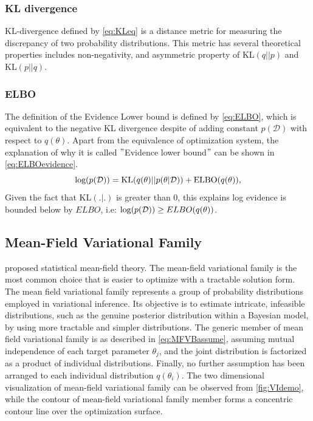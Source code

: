 \subsubsection{KL divergence}
 KL-divergence defined by \autoref{eq:KLeq} is a distance metric for measuring the discrepancy of two probability distributions. This metric has several theoretical properties includes non-negativity, and asymmetric property of KL$(q||p)$ and KL$(p||q)$.

\subsubsection{ELBO}
The definition of the Evidence Lower bound is defined by \autoref{eq:ELBO}, which is equivalent to the negative KL divergence despite of adding constant $p(\mathcal{D})$ with respect to $q(\theta)$. 
Apart from the equivalence of optimization system, the explanation of why it is called $"$Evidence lower bound$"$ can be shown in \autoref{eq:ELBOevidence}.
\begin{equation}
	\label{eq:ELBOevidence}
	\textnormal{log}(p(\mathcal{D})) = \text{KL}(q(\theta)||p(\theta|\mathcal{D})) + \text{ELBO}(q(\theta)),
\end{equation}
Given the fact that KL$(.|.)$ is greater than 0, this explains log evidence is bounded below by $ELBO$, i.e: $\textnormal{log}(p(\mathcal{D})) \geq ELBO(q(\theta))$.

\subsection{Mean-Field Variational Family} 
\cite{parisi1988statistical} proposed statistical mean-field theory. The mean-field variational family is the most common choice that is easier to optimize with a tractable solution form.
The mean field variational family represents a group of probability distributions employed in variational inference. Its objective is to estimate intricate, infeasible distributions, such as the genuine posterior distribution within a Bayesian model, by using more tractable and simpler distributions.
The generic member of mean field variational family is as described in \autoref{eq:MFVBassume}, assuming mutual independence of each target parameter $\theta_j$, and the joint distribution is factorized as a product of individual distributions. Finally, no further assumption has been arranged to each individual distribution $q(\theta_i)$.
The two dimensional visualization of mean-field variational family can be observed from \autoref{fig:VIdemo}, while the contour of mean-field variational family member forms a concentric contour line over the optimization surface.





